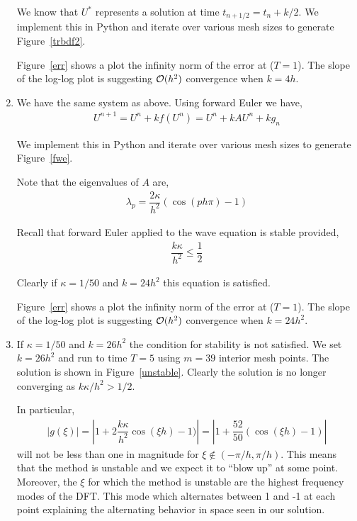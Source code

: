 \documentclass[10pt]{article}
\begin{document}
\begin{solution}[Solution]
\begin{enumerate}[label=(\alph*)]
    We know that \( U^* \) represents a solution at time \( t_{n+1/2} = t_n+k/2 \). We implement this in Python and iterate over various mesh sizes to generate Figure~\ref{trbdf2}.


    Figure~\ref{err} shows a plot the infinity norm of the  error at (\( T = 1 \)). The slope of the log-log plot is  suggesting \( \mathcal{O}(h^2) \) convergence when \( k=4h \).

    \item We have the same system as above. Using forward Euler we have,
    \begin{align*}
        U^{n+1} = U^{n} + k f(U^n) = U^n + kAU^n + kg_n
    \end{align*}

    We implement this in Python and iterate over various mesh sizes to generate Figure~\ref{fwe}.

    Note that the eigenvalues of \( A \) are,
    \begin{align*}
        \lambda_p = \dfrac{2\kappa}{h^2}(\cos(ph\pi)-1)
    \end{align*}

    Recall that forward Euler applied to the wave equation is stable provided,
    \begin{align*}
        \dfrac{k\kappa}{h^2} \leq \dfrac{1}{2}
    \end{align*}

    Clearly if \( \kappa = 1/50 \) and \( k=24h^2 \) this equation is satisfied.

    Figure~\ref{err} shows a plot the infinity norm of the  error at (\( T = 1 \)). The slope of the log-log plot is  suggesting \( \mathcal{O}(h^2) \) convergence when \( k=24h^2 \).

    \item
    If \( \kappa = 1/50 \) and \( k=26h^2 \) the condition for stability is not satisfied. We set \( k = 26h^2 \) and run to time \( T = 5 \) using \( m=39 \) interior mesh points. The solution is shown in Figure~\ref{unstable}. Clearly the solution is no longer converging as \( k\kappa/h^2 > 1/2 \).

    In particular,
    \begin{align*}
        |g(\xi)| = \left|1+2 \dfrac{k\kappa}{h^2}\cos(\xi h)-1)\right|
        = \left|1+ \dfrac{52}{50}(\cos(\xi h)-1)\right|
    \end{align*}
    will not be less than one in magnitude for \( \xi \notin (-\pi/h,\pi/h) \). This means that the method is unstable and we expect it to ``blow up'' at some point. Moreover, the \( \xi \) for which the method is unstable are the highest frequency modes of the DFT. This mode which alternates between 1 and -1 at each point explaining the alternating behavior in space seen in our solution.


\end{enumerate}
\end{solution}
\end{document}
